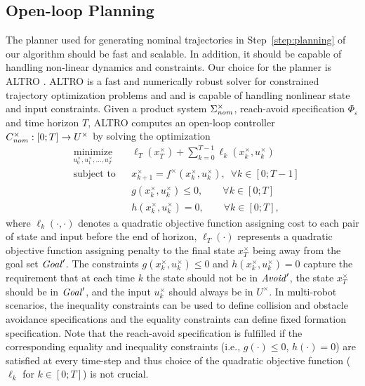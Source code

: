 

\subsection{Open-loop Planning}
The planner used for generating nominal trajectories in Step~\ref{step:planning} of our algorithm should be fast and scalable. In addition, it should be capable of handling non-linear dynamics and constraints. Our choice for the planner is ALTRO \cite{howell2019altro}. ALTRO is a fast and numerically robust solver for constrained trajectory optimization problems and and is capable of handling nonlinear state and input constraints. Given a product system $\Sigma_{\mathit{nom}}^\times$, reach-avoid specification $\Phi_\varepsilon$ and time horizon $T$, ALTRO computes an open-loop controller $C^\times_{\mathit{nom}}:[0;T]\rightarrow U^\times$ by solving the optimization
\begin{equation*}
	\begin{aligned}
		& \underset{u^\times_0,u^\times_1,\ldots,u^\times_T}{\text{minimize}}
		& & \ell_T(x^\times_T)+\sum_{k=0}^{T-1}\ell_k(x^\times_k,u^\times_k) \\
		& \text{subject to}
		& & x^\times_{k+1}=f^\times(x^\times_k,u^\times_k),\,\,\,\forall k\in[0;T-1]\\
		& & &  g(x^\times_k,u^\times_k)\leq 0, \qquad\forall k\in[0;T]\\
		& & &  h(x^\times_k,u^\times_k)=0,\qquad\forall k\in[0;T],
	\end{aligned}
\end{equation*}
where $\ell_k(\cdot,\cdot)$ denotes a quadratic objective function assigning cost to each pair of state and input before the end of horizon, $\ell_T(\cdot)$ represents a quadratic objective function assigning penalty to the final state $x^\times_T$ being away from the goal set $\mathit{Goal}'$. The constraints $g(x^\times_k,u^\times_k)\leq 0$ and $h(x^\times_k,u^\times_k)=0$ capture the requirement that at each time $k$ the state should not be in $\mathit{Avoid}'$, the state $x^\times_T$ should be in $\mathit{Goal}'$, and the input $u^\times_k$ should always be in $U^\times$.
%
In multi-robot scenarios, the inequality constraints can be used to define collision and obstacle avoidance specifications and the equality constraints can define fixed formation specification. 
Note that the reach-avoid specification is fulfilled if the corresponding equality and inequality constraints (i.e., $g(\cdot)\leq 0$, $h(\cdot)=0$) are satisfied at every time-step and thus choice of the quadratic objective function ($\ell_k$ for $k\in[0;T]$) is not crucial.

